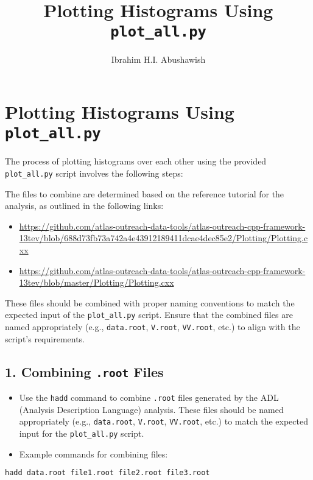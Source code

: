 \documentclass{article}
\begin{document}
\title{Plotting Histograms Using \texttt{plot\_all.py}}
\author{Ibrahim H.I. Abushawish}
\maketitle
\section*{Plotting Histograms Using \texttt{plot\_all.py}}
The process of plotting histograms over each other using the provided \texttt{plot\_all.py} script involves the following steps:

The files to combine are determined based on the reference tutorial for the analysis, as outlined in the following links:
\begin{itemize}
    \item \url{https://github.com/atlas-outreach-data-tools/atlas-outreach-cpp-framework-13tev/blob/688d73fb73a742a4e43912189411dcae4dec85e2/Plotting/Plotting.cxx}
    \item \url{https://github.com/atlas-outreach-data-tools/atlas-outreach-cpp-framework-13tev/blob/master/Plotting/Plotting.cxx}
\end{itemize}

These files should be combined with proper naming conventions to match the expected input of the \texttt{plot\_all.py} script. Ensure that the combined files are named appropriately (e.g., \texttt{data.root}, \texttt{V.root}, \texttt{VV.root}, etc.) to align with the script's requirements.

\subsection*{1. Combining \texttt{.root} Files}
\begin{itemize}
    \item Use the \texttt{hadd} command to combine \texttt{.root} files generated by the ADL (Analysis Description Language) analysis. These files should be named appropriately (e.g., \texttt{data.root}, \texttt{V.root}, \texttt{VV.root}, etc.) to match the expected input for the \texttt{plot\_all.py} script.
    \item Example commands for combining files:
\end{itemize}

\begin{lstlisting}[language=bash]
hadd data.root file1.root file2.root file3.root
\end{lstlisting}
\end{document}

